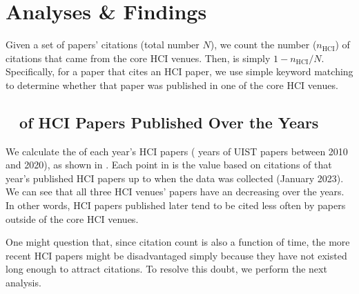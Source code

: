\section{Analyses \& Findings}

Given a set of papers' citations (total number $N$), we count the number ($n_\text{HCI}$) of citations that came from the core HCI venues.
Then, \xin is simply $1-n_\text{HCI}/N$.
Specifically, for a paper that cites an HCI paper, we use simple keyword matching to determine whether that paper was published in one of the core HCI venues.



\subsection{\xin~ of HCI Papers Published Over the Years}
We calculate the \xin of each year's HCI papers ( years of UIST papers between 2010 and 2020), as shown in .
Each point in  is the \xin value based on citations of that year's published HCI papers up to when the data was collected (January 2023).
We can see that all three HCI venues' papers have an decreasing \xin over the years.
In other words, HCI papers published later tend to be cited less often by papers outside of the core HCI venues.

One might question that, since citation count is also a function of time, the more recent HCI papers might be disadvantaged simply because they have not existed long enough to attract citations.
To resolve this doubt, we perform the next analysis.

